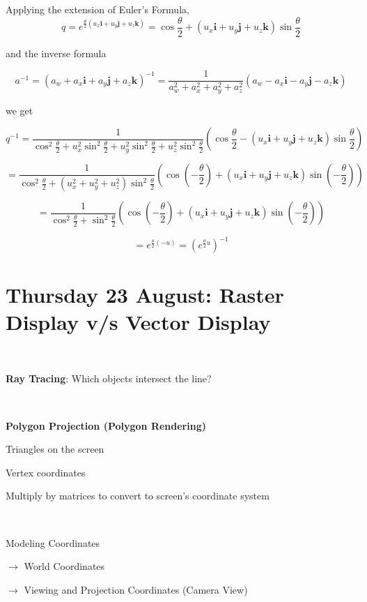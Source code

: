 \documentclass[12pt]{article}
\begin{document}
\begin{spacing}{1.2}
Applying the extension of Euler's Formula, 
$$q = e^{ 
	\frac{\theta}{2}
	( u_x \mathbf{i} + u_y \mathbf{j} + u_z \mathbf{k} )
	}
=
	\cos \frac{\theta}{2} + ( u_x \mathbf{i} + u_y \mathbf{j} + u_z \mathbf{k} ) \sin \frac{\theta}{2}
$$

and the inverse formula

$$a^{-1} = (a_w + a_x \mathbf{i} + a_y \mathbf{j} + a_z \mathbf{k})^{-1} = 
\frac{1}{a_w^2 + a_x^2 + a_y^2 + a_z^2} (a_w - a_x \mathbf{i} - a_y \mathbf{j} - a_z \mathbf{k} )$$

we get

$$q^{-1} = \frac{1}{
	\cos^2 \frac{\theta}{2}
	 + u_x^2 \sin ^2 \frac{\theta}{2}
	 + u_y^2 \sin ^2 \frac{\theta}{2}
	 + u_z^2 \sin ^2 \frac{\theta}{2}
	}
	\left(\cos \frac{\theta}{2} - ( u_x \mathbf{i} + u_y \mathbf{j} + u_z \mathbf{k} ) \sin \frac{\theta}{2}\right)
$$

$$ = \frac{1}{
	\cos^2 \frac{\theta}{2}
	 + (u_x^2 
	 + u_y^2 
	 + u_z^2) \sin ^2 \frac{\theta}{2}
	}
	\left(\cos \left( - \frac{\theta}{2} \right) + ( u_x \mathbf{i} + u_y \mathbf{j} + u_z \mathbf{k} ) \sin \left(-\frac{\theta}{2}\right)\right)
$$

$$ = \frac{1}{
	\cos^2 \frac{\theta}{2}
	+ \sin ^2 \frac{\theta}{2}
	}
	\left(\cos \left( - \frac{\theta}{2} \right) + ( u_x \mathbf{i} + u_y \mathbf{j} + u_z \mathbf{k} ) \sin \left(-\frac{\theta}{2}\right)\right)
$$

$$ = e^{\frac{\theta}{2}(-u)} = \left(e^{\frac{\theta}{2}u}\right)^{-1}
$$

\section{Thursday 23 August:  Raster Display v/s Vector Display}

\

{\bf Ray Tracing}:  Which objects intersect the line?

\

{\bf Polygon Projection (Polygon Rendering)}

Triangles on the screen

Vertex coordinates

Multiply by matrices to convert to screen's coordinate system

\

Modeling Coordinates 

\qquad $\to$ World Coordinates

\qquad $\to$ Viewing and Projection Coordinates (Camera View)


\end{spacing}
\end{document}
